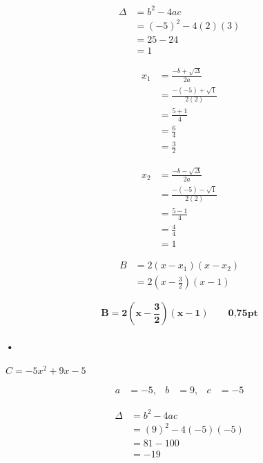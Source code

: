 \documentclass[12pt,a4paper]{article}
\begin{document}
\begin{enumerate}
\[
\begin{aligned}
\Delta &= b^2 - 4ac \\
       &= (-5)^2 - 4(2)(3) \\
       &= 25 - 24 \\
       &= 1
\end{aligned}
\]

\[
\begin{aligned}
x_1 &= \frac{-b + \sqrt{\Delta}}{2a} \\
    &= \frac{-(-5) + \sqrt{1}}{2(2)} \\
    &= \frac{5 + 1}{4} \\
    &= \frac{6}{4} \\
    &= \frac{3}{2}
\end{aligned}
\]

\[
\begin{aligned}
x_2 &= \frac{-b - \sqrt{\Delta}}{2a} \\
    &= \frac{-(-5) - \sqrt{1}}{2(2)} \\
    &= \frac{5 - 1}{4} \\
    &= \frac{4}{4} \\
    &= 1
\end{aligned}
\]

\[
\begin{aligned}
B &= 2(x - x_1)(x - x_2) \\
  &= 2 \left( x - \frac{3}{2} \right) (x - 1)
\end{aligned}
\]

\begin{tcolorbox}[colback=yellow!20, colframe=black, sharp corners]
    \[
    \mathbf{B = 2 \left( x - \frac{3}{2} \right) (x - 1)}\quad\quad \textbf{0,75pt}
    \]
\end{tcolorbox}

\paragraph{•}
\(
C = -5x^2 + 9x - 5
\)

\[
\begin{aligned}
a &= -5, & b &= 9, & c &= -5
\end{aligned}
\]

\[
\begin{aligned}
\Delta &= b^2 - 4ac \\
       &= (9)^2 - 4(-5)(-5) \\
       &= 81 - 100 \\
       &= -19
\end{aligned}
\]


\end{enumerate}
\end{document}
